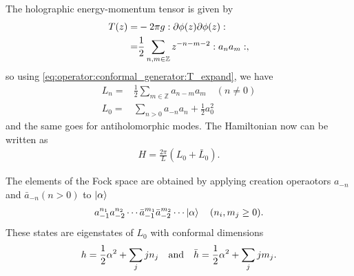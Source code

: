 \documentclass[10pt]{article}
\begin{document}
The holographic energy-momentum tensor is given by 
\begin{align}
    T(z)= & -2\pi g:\partial\phi(z)\partial\phi(z):\notag          \\
    =     & \frac{1}{2}\sum_{n,m\in\mathbb{Z}}z^{-n-m-2}:a_n a_m:,
\end{align}
so using \cref{eq:operator:conformal_generator:T_expand}, we have 
\begin{subequations}
    \begin{align}
        L_n= & \frac{1}{2}\sum_{m\in\mathbb{Z}}a_{n-m}a_m\quad(n\neq0) \\
        L_0= & \sum_{n>0}a_{-n}a_n+\frac{1}{2}a_0^2
    \end{align}
\end{subequations}
and the same goes for antiholomorphic modes.
The Hamiltonian now can be written as 
\begin{align}
    H=\frac{2\pi}{L}\left(L_0+\bar{L}_0\right).
\end{align}

The elements of the Fock space are obtained by applying creation operaotors $a_{-n}$ and $\bar{a}_{-n} (n>0)$ to $\ket{\alpha}$
\begin{align}
    a_{-1}^{n_1}a_{-2}^{n_2}\cdots\bar{a}_{-1}^{m_1}\bar{a}_{-2}^{m_2}\cdots\ket{\alpha}\quad(n_i,m_j\geq0).
\end{align}
These states are eigenstates of $L_0$ with conformal dimensions 
\begin{align}
    h=\frac{1}{2}\alpha^2+\sum_j j n_j\qand \bar{h}=\frac{1}{2}\alpha^2+\sum_j jm_j.
\end{align}
\end{document}
